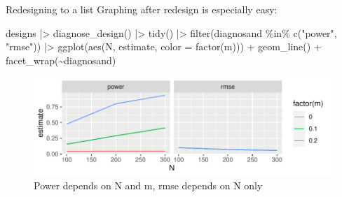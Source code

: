 \documentclass[
  11pt,
  ignorenonframetext,
]{beamer}
\newenvironment{Shaded}{\begin{snugshade}}{\end{snugshade}}
\newcommand{\AttributeTok}[1]{\textcolor[rgb]{0.40,0.45,0.13}{#1}}
\newcommand{\FunctionTok}[1]{\textcolor[rgb]{0.28,0.35,0.67}{#1}}
\newcommand{\NormalTok}[1]{\textcolor[rgb]{0.00,0.23,0.31}{#1}}
\newcommand{\SpecialCharTok}[1]{\textcolor[rgb]{0.37,0.37,0.37}{#1}}
\newcommand{\StringTok}[1]{\textcolor[rgb]{0.13,0.47,0.30}{#1}}
\begin{document}
\begin{frame}[fragile]{Redesigning to a list}
\protect\hypertarget{redesigning-to-a-list-3}{}
Graphing after redesign is especially easy:

\begin{Shaded}
\begin{Highlighting}[]
\NormalTok{designs }\SpecialCharTok{|\textgreater{}} \FunctionTok{diagnose\_design}\NormalTok{() }\SpecialCharTok{|\textgreater{}} 
  \FunctionTok{tidy}\NormalTok{() }\SpecialCharTok{|\textgreater{}}
  \FunctionTok{filter}\NormalTok{(diagnosand }\SpecialCharTok{\%in\%} \FunctionTok{c}\NormalTok{(}\StringTok{"power"}\NormalTok{, }\StringTok{"rmse"}\NormalTok{)) }\SpecialCharTok{|\textgreater{}} 
  \FunctionTok{ggplot}\NormalTok{(}\FunctionTok{aes}\NormalTok{(N, estimate, }\AttributeTok{color =} \FunctionTok{factor}\NormalTok{(m))) }\SpecialCharTok{+} 
  \FunctionTok{geom\_line}\NormalTok{() }\SpecialCharTok{+} 
  \FunctionTok{facet\_wrap}\NormalTok{(}\SpecialCharTok{\textasciitilde{}}\NormalTok{diagnosand)}
\end{Highlighting}
\end{Shaded}

\begin{figure}

{\centering \includegraphics{0_lectures_files/figure-beamer/unnamed-chunk-66-1.pdf}

}

\caption{Power depends on N and m, rmse depends on N only}

\end{figure}
\end{frame}
\end{document}
